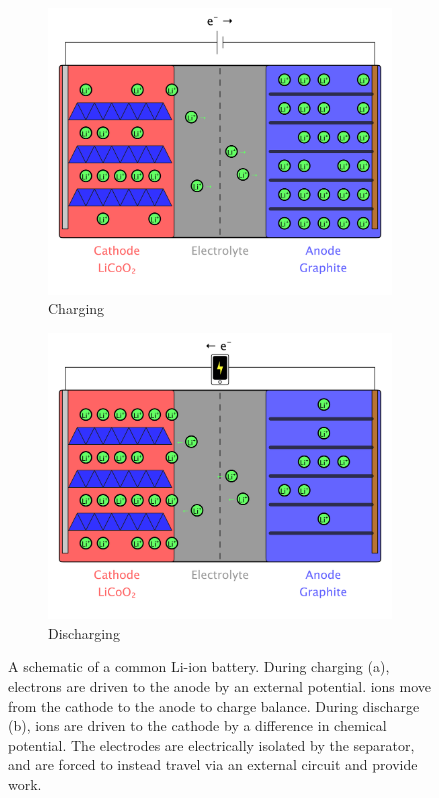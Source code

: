 \begin{figure}
\centering
\begin{subfigure}{\linewidth}
  \centering
  \includegraphics[width=0.7\linewidth, trim=1cm 1cm 1cm 1cm, clip]{figures/batteryCharge/batteryCharge}
  \caption{Charging}
  \label{fig:GoodenoughCharging}
\end{subfigure}

\begin{subfigure}{\linewidth}
  \centering
  \includegraphics[width=0.7\linewidth, trim=1cm 1cm 1cm 1cm, clip]{figures/batteryDischarge/batteryDischarge}
  \caption{Discharging}
  \label{fig:GoodenoughDischarging}
\end{subfigure}
\caption[Li-ion battery schematic]{A schematic of a common Li-ion battery. During charging (a), electrons are driven to the anode by an external potential.  ions move from the cathode to the anode to charge balance. During discharge (b),  ions are driven to the cathode by a difference in chemical potential. The electrodes are electrically isolated by the separator, and are forced to instead travel via an external circuit and provide work.} 
\label{fig:Goodenough}
\end{figure}


